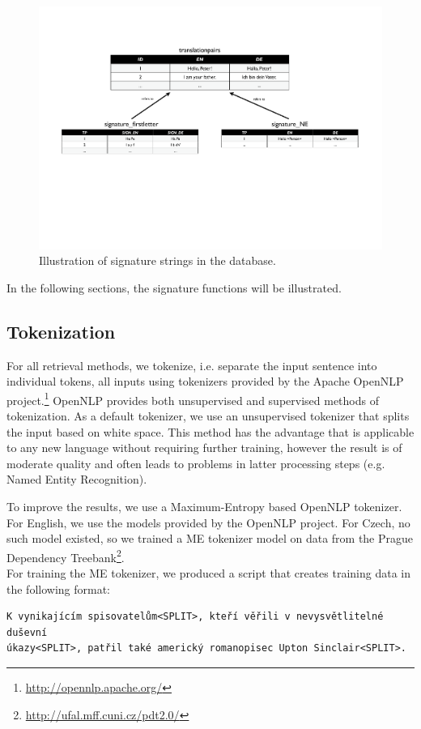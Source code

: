 \begin{figure}[htbp]
	\centering
		\includegraphics[width=17cm]{figures/core/signatures.pdf}
	\caption{Illustration of signature strings in the database.}
	\label{fig:figures_core_signatures}
\end{figure}

In the following sections, the signature functions will be illustrated.


\subsection{Tokenization}

For all retrieval methods, we tokenize, i.e. separate the input sentence into individual tokens,
all inputs using tokenizers provided by the Apache OpenNLP project.\footnote{\url{http://opennlp.apache.org/}}
OpenNLP provides both unsupervised and supervised methods of tokenization. 
As a default tokenizer, we use an unsupervised tokenizer that splits the input
based on white space. This method has the advantage that is applicable to any new
language without requiring further training, however the result is of moderate
quality and often leads to problems in latter processing steps (e.g. Named Entity Recognition).

To improve the results, we use a Maximum-Entropy based OpenNLP tokenizer. For English, we use the
models provided by the OpenNLP project. For Czech, no such model existed, so we trained a ME tokenizer
model on data from the Prague Dependency Treebank\footnote{\url{http://ufal.mff.cuni.cz/pdt2.0/}}.\\

\noindent For training the ME tokenizer, we produced a script that creates training data in the following format:
\begin{verbatim}
K vynikajícím spisovatelům<SPLIT>, kteří věřili v nevysvětlitelné duševní 
úkazy<SPLIT>, patřil také americký romanopisec Upton Sinclair<SPLIT>.
\end{verbatim}

